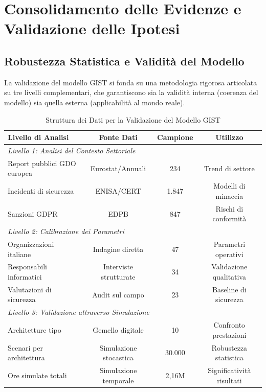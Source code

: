 \section{\texorpdfstring{Consolidamento delle Evidenze e Validazione delle Ipotesi}{5.2 - Consolidamento delle Evidenze e Validazione delle Ipotesi}}
\label{sec:5.2}

\subsection{\texorpdfstring{Robustezza Statistica e Validità del Modello}{5.2.1 - Robustezza Statistica e Validità del Modello}}
\label{subsec:5.2.1}

La validazione del modello GIST si fonda su una metodologia rigorosa articolata su tre livelli complementari, che garantiscono sia la validità interna (coerenza del modello) sia quella esterna (applicabilità al mondo reale).

\begin{table}[htbp]
\centering
\caption{Struttura dei Dati per la Validazione del Modello GIST}
\label{tab:validation_data_structure}
\begin{tabular}{lccc}
\toprule
\textbf{Livello di Analisi} & \textbf{Fonte Dati} & \textbf{Campione} & \textbf{Utilizzo} \\
\midrule
\multicolumn{4}{l}{\textit{Livello 1: Analisi del Contesto Settoriale}} \\
Report pubblici GDO europea & Eurostat/Annuali & 234 & Trend di settore \\
Incidenti di sicurezza & ENISA/CERT & 1.847 & Modelli di minaccia \\
Sanzioni GDPR & EDPB & 847 & Rischi di conformità \\
\midrule
\multicolumn{4}{l}{\textit{Livello 2: Calibrazione dei Parametri}} \\
Organizzazioni italiane & Indagine diretta & 47 & Parametri operativi \\
Responsabili informatici & Interviste strutturate & 34 & Validazione qualitativa \\
Valutazioni di sicurezza & Audit sul campo & 23 & Baseline di sicurezza \\
\midrule
\multicolumn{4}{l}{\textit{Livello 3: Validazione attraverso Simulazione}} \\
Architetture tipo & Gemello digitale & 10 & Confronto prestazioni \\
Scenari per architettura & Simulazione stocastica & 30.000 & Robustezza statistica \\
Ore simulate totali & Simulazione temporale & 2,16M & Significatività risultati \\
\bottomrule
\end{tabular}
\end{table}

